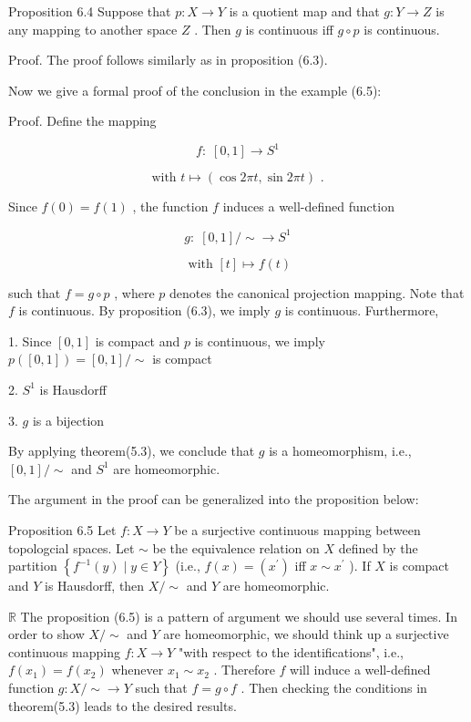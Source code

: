 Proposition 6.4 Suppose that \(p : X \rightarrow  Y\) is a quotient map and that \(g : Y \rightarrow  Z\) is any mapping to another space \(Z\) . Then \(g\) is continuous iff \(g \circ  p\) is continuous.

Proof. The proof follows similarly as in proposition (6.3).

Now we give a formal proof of the conclusion in the example (6.5):

Proof. Define the mapping

\[
f : \;\left\lbrack  {0,1}\right\rbrack   \rightarrow  {S}^{1}
\]

\[
\text{ with }t \mapsto  \left( {\cos {2\pi t},\sin {2\pi t}}\right) \text{ . }
\]

Since \(f\left( 0\right)  = f\left( 1\right)\) , the function \(f\) induces a well-defined function

\[
g : \;\left\lbrack  {0,1}\right\rbrack  / \sim   \rightarrow  {S}^{1}
\]

\[
\text{ with }\left\lbrack  t\right\rbrack   \mapsto  f\left( t\right)
\]

such that \(f = g \circ  p\) , where \(p\) denotes the canonical projection mapping. Note that \(f\) is continuous. By proposition (6.3), we imply \(g\) is continuous. Furthermore,

1. Since \(\left\lbrack  {0,1}\right\rbrack\) is compact and \(p\) is continuous, we imply \(p\left( \left\lbrack  {0,1}\right\rbrack  \right)  = \left\lbrack  {0,1}\right\rbrack  / \sim\) is compact

2. \({S}^{1}\) is Hausdorff

3. \(g\) is a bijection

By applying theorem(5.3), we conclude that \(g\) is a homeomorphism, i.e., \(\left\lbrack  {0,1}\right\rbrack  / \sim\) and \({S}^{1}\) are homeomorphic.

The argument in the proof can be generalized into the proposition below:

Proposition 6.5 Let \(f : X \rightarrow  Y\) be a surjective continuous mapping between topologcial spaces. Let \(\sim\) be the equivalence relation on \(X\) defined by the partition \(\left\{  {{f}^{-1}\left( y\right)  \mid  y \in  Y}\right\}\) (i.e., \(f\left( x\right)  = \left( {x}^{\prime }\right)\) iff \(x \sim  {x}^{\prime }\) ). If \(X\) is compact and \(Y\) is Hausdorff, then \(X/ \sim\) and \(Y\) are homeomorphic.

\(\mathbb{R}\) The proposition (6.5) is a pattern of argument we should use several times. In order to show \(X/ \sim\) and \(Y\) are homeomorphic, we should think up a surjective continuous mapping \(f : X \rightarrow  Y\) "with respect to the identifications", i.e., \(f\left( {x}_{1}\right)  = f\left( {x}_{2}\right)\) whenever \({x}_{1} \sim  {x}_{2}\) . Therefore \(f\) will induce a well-defined function \(g : X/ \sim   \rightarrow  Y\) such that \(f = g \circ  f\) . Then checking the conditions in theorem(5.3) leads to the desired results.

